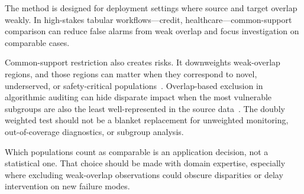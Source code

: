 The method is designed for deployment settings where source and target overlap weakly. In high-stakes tabular workflows---credit, healthcare---common-support comparison can reduce false alarms from weak overlap and focus investigation on comparable cases.

Common-support restriction also creates risks. It downweights weak-overlap regions, and those regions can matter when they correspond to novel, underserved, or safety-critical populations~\cite{Barocas_2023}. Overlap-based exclusion in algorithmic auditing can hide disparate impact when the most vulnerable subgroups are also the least well-represented in the source data~\cite{Dwork_2012}. The doubly weighted test should not be a blanket replacement for unweighted monitoring, out-of-coverage diagnostics, or subgroup analysis.

Which populations count as comparable is an application decision, not a statistical one. That choice should be made with domain expertise, especially where excluding weak-overlap observations could obscure disparities or delay intervention on new failure modes.
